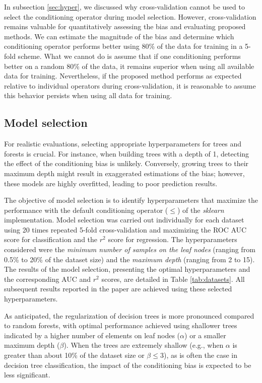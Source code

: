 \documentclass[sn-mathphys]{sn-jnl}%
\theoremstyle{thmstyleone}%
\theoremstyle{thmstyletwo}%
\theoremstyle{thmstylethree}%
\begin{document}
In subsection \ref{sec:hyper}, we discussed why cross-validation cannot be used to select the conditioning operator during model selection. However, cross-validation remains valuable for quantitatively assessing the bias and evaluating proposed methods. We can estimate the magnitude of the bias and determine which conditioning operator performs better using 80\% of the data for training in a 5-fold scheme. What we cannot do is assume that if one conditioning performs better on a random 80\% of the data, it remains superior when using all available data for training. Nevertheless, if the proposed method performs as expected relative to individual operators during cross-validation, it is reasonable to assume this behavior persists when using all data for training.

\subsection{Model selection}
\label{sec:tests-model}

For realistic evaluations, selecting appropriate hyperparameters for trees and forests is crucial. For instance, when building trees with a depth of 1, detecting the effect of the conditioning bias is unlikely. Conversely, growing trees to their maximum depth might result in exaggerated estimations of the bias; however, these models are highly overfitted, leading to poor prediction results.

The objective of model selection is to identify hyperparameters that maximize the performance with the default conditioning operator ($\leq$) of the \emph{sklearn} \citep{sklearn} implementation. Model selection was carried out individually for each dataset using 20 times repeated 5-fold cross-validation and maximizing the ROC AUC score \citep{auc} for classification and the $r^2$ score for regression. The hyperparameters considered were the \emph{minimum number of samples on the leaf nodes} (ranging from 0.5\% to 20\% of the dataset size) and the \emph{maximum depth} (ranging from 2 to 15). The results of the model selection, presenting the optimal hyperparameters and the corresponding AUC and $r^2$ scores, are detailed in Table \ref{tab:datasets}. All subsequent results reported in the paper are achieved using these selected hyperparameters.

As anticipated, the regularization of decision trees is more pronounced compared to random forests, with optimal performance achieved using shallower trees indicated by a higher number of elements on leaf nodes ($\alpha$) or a smaller maximum depth ($\beta$). When the trees are extremely shallow (e.g., when $\alpha$ is greater than about 10\% of the dataset size or $\beta \leq 3$), as is often the case in decision tree classification, the impact of the conditioning bias is expected to be less significant.
\end{document}
